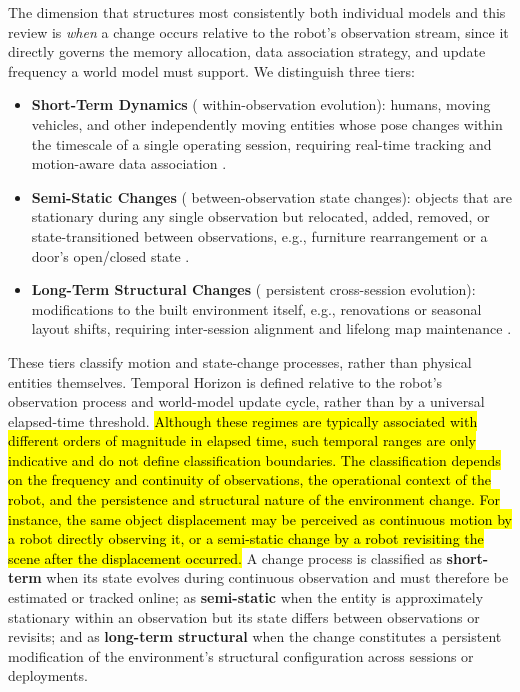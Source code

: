The dimension that structures most consistently both individual models and this review is \textit{when} a change occurs relative to the robot's observation stream, since it directly governs the memory allocation, data association strategy, and update frequency a world model must support. 
We distinguish three tiers:

\begin{itemize}
    \item \textbf{Short-Term Dynamics} ( within-observation evolution): humans, moving vehicles, and other independently moving entities whose pose changes within the timescale of a single operating session, requiring real-time tracking and motion-aware data association \cite{bescos_dynaslam_2021} \cite{morris_dynosam_2025} \cite{schmid_khronos_2024}.
    \item \textbf{Semi-Static Changes} ( between-observation state changes): objects that are stationary during any single observation but relocated, added, removed, or state-transitioned between observations, e.g., furniture rearrangement or a door's open/closed state \cite{gomez_object-based_2020} \cite{giberna_dynemo-slam_2025} \cite{schmid_khronos_2024}.
    \item \textbf{Long-Term Structural Changes} ( persistent cross-session evolution): modifications to the built environment itself, e.g., renovations or seasonal layout shifts, requiring inter-session alignment and lifelong map maintenance \cite{walcott-bryant_dynamic_2012} \cite{kim2022lt}.
\end{itemize}
These tiers classify motion and state-change processes, rather than physical entities themselves.
Temporal Horizon is defined relative to the robot's observation process and world-model update cycle, rather than by a universal elapsed-time threshold.
\hl{Although these regimes are typically associated with different orders of magnitude in elapsed time, such temporal ranges are only indicative and do not define classification boundaries.
The classification depends on the frequency and continuity of observations, the operational context of the robot, and the persistence and structural nature of the environment change. 
For instance, the same object displacement may be perceived as continuous motion by a robot directly observing it, or a semi-static change by a robot revisiting the scene after the displacement occurred. }
A change process is classified as \textbf{short-term} when its state evolves during continuous observation and must therefore be estimated or tracked online; as \textbf{semi-static} when the entity is approximately stationary within an observation but its state differs between observations or revisits; and as \textbf{long-term structural} when the change constitutes a persistent modification of the environment's structural configuration across sessions or deployments. 

